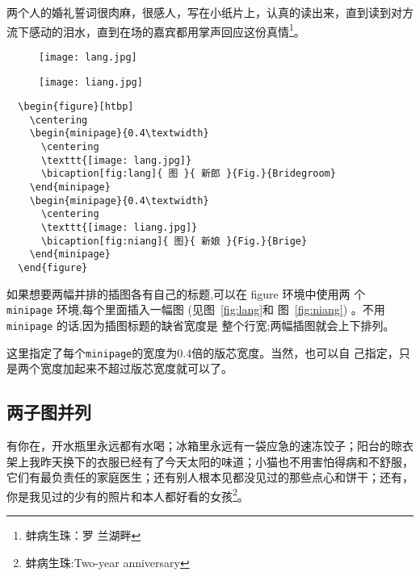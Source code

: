 两个人的婚礼誓词很肉麻，很感人，写在小纸片上，认真的读出来，直到读到对方
流下感动的泪水，直到在场的嘉宾都用掌声回应这份真情\footnote{蚌病生珠：罗
  兰湖畔}。

\begin{figure}[htbp]
  \centering
  \begin{minipage}{0.4\textwidth}
    \centering
    \texttt{[image: lang.jpg]}
  \end{minipage}
  \begin{minipage}{0.4\textwidth}
    \centering
    \texttt{[image: liang.jpg]}
  \end{minipage}
\end{figure}

\begin{lstlisting}
  \begin{figure}[htbp]
    \centering
    \begin{minipage}{0.4\textwidth}
      \centering
      \texttt{[image: lang.jpg]}
      \bicaption[fig:lang]{ 图 }{ 新郎 }{Fig.}{Bridegroom}
    \end{minipage}
    \begin{minipage}{0.4\textwidth}
      \centering
      \texttt{[image: liang.jpg]}
      \bicaption[fig:niang]{ 图}{ 新娘 }{Fig.}{Brige}
    \end{minipage}
  \end{figure}
\end{lstlisting}


如果想要两幅并排的插图各有自己的标题,可以在 figure 环境中使用两
个 \texttt{minipage} 环境,每个里面插入一幅图 (见图~\ref{fig:lang}和
图~\ref{fig:niang}) 。不用 \texttt{minipage} 的话,因为插图标题的缺省宽度是
整个行宽;两幅插图就会上下排列。

这里指定了每个\texttt{minipage}的宽度为0.4倍的版芯宽度。当然，也可以自
己指定，只是两个宽度加起来不超过版芯宽度就可以了。


\subsection{两子图并列}

有你在，开水瓶里永远都有水喝；冰箱里永远有一袋应急的速冻饺子；阳台的晾衣
架上我昨天换下的衣服已经有了今天太阳的味道；小猫也不用害怕得病和不舒服，
它们有最负责任的家庭医生；还有别人根本见都没见过的那些点心和饼干；还有，
你是我见过的少有的照片和本人都好看的女孩\footnote{蚌病生珠:Two-year
  anniversary}。


